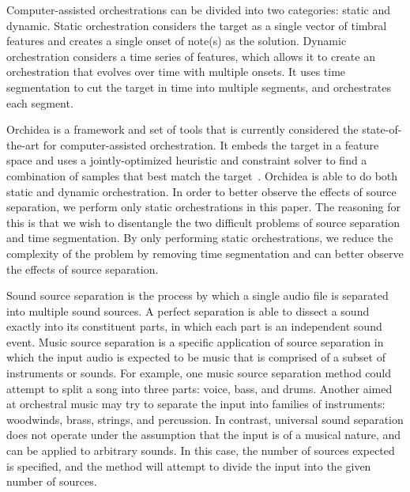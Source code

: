\documentclass{article}
\begin{document}
	Computer-assisted orchestrations can be divided into two categories: static and dynamic. Static orchestration considers the target as a single vector of timbral features and creates a single onset of note(s) as the solution. Dynamic orchestration considers a time series of features, which allows it to create an orchestration that evolves over time with multiple onsets. It uses time segmentation to cut the target in time into multiple segments, and orchestrates each segment.
	
	Orchidea is a framework and set of tools that is currently considered the state-of-the-art for computer-assisted orchestration. It embeds the target in a feature space and uses a jointly-optimized heuristic and constraint solver to find a combination of samples that best match the target~\cite{Cella18, Cella2020}. Orchidea is able to do both static and dynamic orchestration. In order to better observe the effects of source separation, we perform only static orchestrations in this paper. The reasoning for this is that we wish to disentangle the two difficult problems of source separation and time segmentation. By only performing static orchestrations, we reduce the complexity of the problem by removing time segmentation and can better observe the effects of source separation. 

	Sound source separation is the process by which a single audio file is separated into multiple sound sources. A perfect separation is able to dissect a sound exactly into its constituent parts, in which each part is an independent sound event. Music source separation is a specific application of source separation in which the input audio is expected to be music that is comprised of a subset of instruments or sounds. For example, one music source separation method could attempt to split a song into three parts: voice, bass, and drums. Another aimed at orchestral music may try to separate the input into families of instruments: woodwinds, brass, strings, and percussion. In contrast, universal sound separation does not operate under the assumption that the input is of a musical nature, and can be applied to arbitrary sounds. In this case, the number of sources expected is specified, and the method will attempt to divide the input into the given number of sources.		
	
\end{document}
